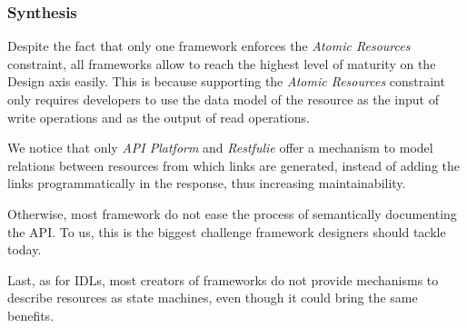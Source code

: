 \subsubsection*{Synthesis}
Despite the fact that only one framework enforces the \textit{Atomic Resources} constraint, all frameworks allow to reach the highest level of maturity on the Design axis easily. This is because supporting the \textit{Atomic Resources} constraint only requires developers to use the data model of the resource as the input of write operations and as the output of read operations.

We notice that only \textit{API Platform} and \textit{Restfulie} offer a mechanism to model relations between resources from which links are generated, instead of adding the links programmatically in the response, thus increasing maintainability.

Otherwise, most framework do not ease the process of semantically documenting the API. To us, this is the biggest challenge framework designers should tackle today.

Last, as for IDLs, most creators of frameworks do not provide mechanisms to describe resources as state machines, even though it could bring the same benefits.
